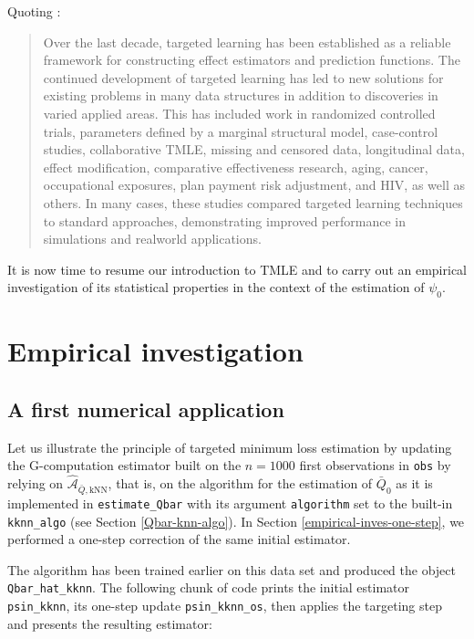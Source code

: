 \documentclass[
  11pt,
  openright,twoside]{book}
\newcommand{\Algo}{\widehat{\mathcal{A}}}
\newcommand{\Qbar}{\bar{Q}}
\theoremstyle{definition}
\theoremstyle{definition}
\theoremstyle{definition}
\theoremstyle{definition}
\theoremstyle{remark}
\begin{document}
Quoting \citep{TMLEbook18}:

\begin{quote}
Over the last decade, targeted learning has been established as a reliable framework for constructing effect estimators and prediction functions. The continued development of targeted learning has led to new solutions for existing problems in many data structures in addition to discoveries in varied applied areas. This has included work in randomized controlled trials, parameters defined by a marginal structural model, case-control studies, collaborative TMLE, missing and censored data, longitudinal data, effect modification, comparative effectiveness research, aging, cancer, occupational exposures, plan payment risk adjustment, and HIV, as well as others. In many cases, these studies compared targeted learning techniques to standard approaches, demonstrating improved performance in simulations and realworld applications.
\end{quote}

It is now time to resume our introduction to TMLE and to carry out an
empirical investigation of its statistical properties in the context of the
estimation of \(\psi_{0}\).

\hypertarget{empirical-inves-tmle}{%
\section{Empirical investigation}\label{empirical-inves-tmle}}

\hypertarget{empirical-inves-tmle-first}{%
\subsection{A first numerical application}\label{empirical-inves-tmle-first}}

Let us illustrate the principle of targeted minimum loss estimation by
updating the G-computation estimator built on the \(n=1000\) first observations
in \texttt{obs} by relying on \(\Algo_{\Qbar,\text{kNN}}\), that is, on the algorithm
for the estimation of \(\Qbar_{0}\) as it is implemented in \texttt{estimate\_Qbar} with
its argument \texttt{algorithm} set to the built-in \texttt{kknn\_algo} (see Section
\ref{Qbar-knn-algo}). In Section \ref{empirical-inves-one-step}, we
performed a one-step correction of the same initial estimator.

The algorithm has been trained earlier on this data set and produced the
object \texttt{Qbar\_hat\_kknn}. The following chunk of code prints the initial
estimator \texttt{psin\_kknn}, its one-step update \texttt{psin\_kknn\_os}, then applies the
targeting step and presents the resulting estimator:
\end{document}
